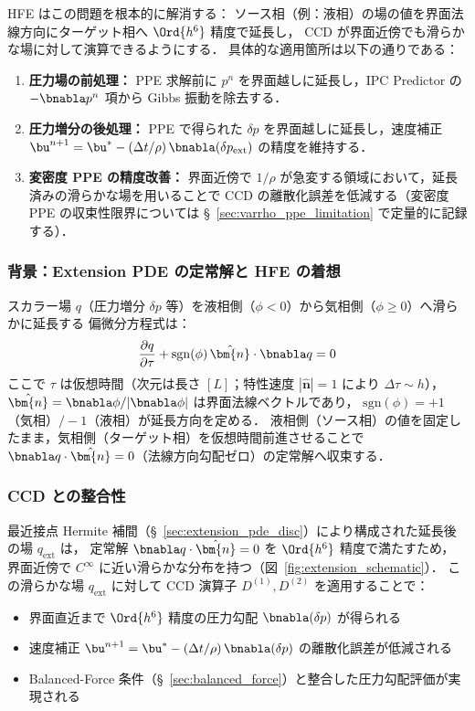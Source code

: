 HFE はこの問題を根本的に解消する：
ソース相（例：液相）の場の値を界面法線方向にターゲット相へ $\Ord{h^6}$ 精度で延長し，
CCD が界面近傍でも滑らかな場に対して演算できるようにする．
具体的な適用箇所は以下の通りである：
\begin{enumerate}[noitemsep]
  \item \textbf{圧力場の前処理：}
        PPE 求解前に $p^n$ を界面越しに延長し，IPC Predictor の $-\bnabla p^n$ 項から
        Gibbs 振動を除去する．
  \item \textbf{圧力増分の後処理：}
        PPE で得られた $\delta p$ を界面越しに延長し，速度補正
        $\bu^{n+1} = \bu^* - (\Delta t/\rho)\,\bnabla(\delta p_{\mathrm{ext}})$ の精度を維持する．
  \item \textbf{変密度 PPE の精度改善：}
        界面近傍で $1/\rho$ が急変する領域において，延長済みの滑らかな場を用いることで
        CCD の離散化誤差を低減する（変密度 PPE の収束性限界については
        §~\ref{sec:varrho_ppe_limitation} で定量的に記録する）．
\end{enumerate}

\subsubsection{背景：Extension PDE の定常解と HFE の着想}

スカラー場 $q$（圧力増分 $\delta p$ 等）を液相側（$\phi < 0$）から気相側（$\phi \ge 0$）へ滑らかに延長する
偏微分方程式は：
\begin{equation}
  \frac{\partial q}{\partial \tau} + \mathrm{sgn}(\phi)\,\hat{\bm{n}}\cdot\bnabla q = 0
  \label{eq:extension_pde_main}
\end{equation}
\label{eq:extension_pde}%
ここで $\tau$ は仮想時間（次元は長さ $[L]$；特性速度 $|\hat{\bm{n}}| = 1$ により $\Delta\tau \sim h$），
$\hat{\bm{n}} = \bnabla\phi/|\bnabla\phi|$ は界面法線ベクトルであり，
$\mathrm{sgn}(\phi) = +1$（気相）$/-1$（液相）が延長方向を定める．
液相側（ソース相）の値を固定したまま，気相側（ターゲット相）を仮想時間前進させることで
$\bnabla q \cdot \hat{\bm{n}} = 0$（法線方向勾配ゼロ）の定常解へ収束する．

\subsubsection{CCD との整合性}

最近接点 Hermite 補間（§~\ref{sec:extension_pde_disc}）により構成された延長後の場 $q_{\mathrm{ext}}$ は，
定常解 $\bnabla q \cdot \hat{\bm{n}} = 0$ を $\Ord{h^6}$ 精度で満たすため，
界面近傍で $C^\infty$ に近い滑らかな分布を持つ（図~\ref{fig:extension_schematic}）．
この滑らかな場 $q_{\mathrm{ext}}$ に対して CCD 演算子 $D^{(1)}, D^{(2)}$ を適用することで：
\begin{itemize}
  \item 界面直近まで $\Ord{h^6}$ 精度の圧力勾配 $\bnabla(\delta p)$ が得られる
  \item 速度補正 $\bu^{n+1} = \bu^* - (\Delta t/\rho)\,\bnabla(\delta p)$ の離散化誤差が低減される
  \item Balanced-Force 条件（§~\ref{sec:balanced_force}）と整合した圧力勾配評価が実現される
\end{itemize}

